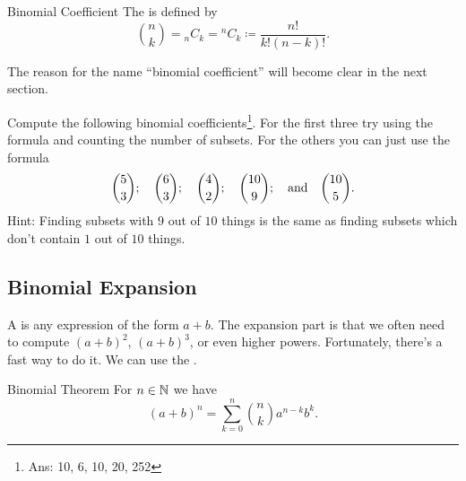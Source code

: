 \documentclass[fleqn]{LectureClass/LectureClass}
\begin{document}
    \begin{dfn}{Binomial Coefficient}{}
        The  is defined by
        \begin{equation}
            \binom{n}{k} = {}_nC_k = {}^nC_k \coloneq \frac{n!}{k!(n - k)!}.
        \end{equation}
    \end{dfn}
     
    The reason for the name \enquote{binomial coefficient} will become clear in the next section.
     
    \begin{problem}{}{}
        Compute the following binomial coefficients\footnote{Ans: 10, 6, 10, 20, 252}.
        For the first three try using the formula and counting the number of subsets.
        For the others you can just use the formula
        \begin{equation}
            \binom{5}{3}; \quad \binom{6}{3}; \quad \binom{4}{2}; \quad \binom{10}{9}; \quad\text{and}\quad \binom{10}{5}.
        \end{equation}
        Hint: Finding subsets with \(9\) out of \(10\) things is the same as finding subsets which don't contain \(1\) out of \(10\) things.
    \end{problem}
     
    \subsection{Binomial Expansion}
    A  is any expression of the form \(a + b\).
    The expansion part is that we often need to compute \((a + b)^2\), \((a + b)^3\), or even higher powers.
    Fortunately, there's a fast way to do it.
    We can use the .
     
    \begin{thm}{Binomial Theorem}{}
        For \(n \in \mathbb{N}\) we have
        \begin{equation}
            (a + b)^n = \sum_{k=0}^n \binom{n}{k} a^{n-k}b^k.
        \end{equation}
    \end{thm}
     
\end{document}
